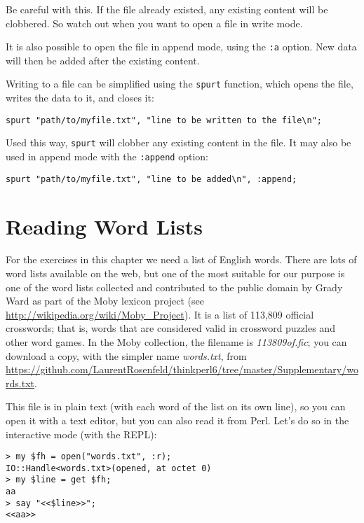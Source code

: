 Be careful with this. If the file already existed, any 
existing content will be clobbered. So watch out when 
you want to open a file in write mode.

It is also possible to open the file in append mode, using the 
{\tt :a} option. New data will then be added after the existing 
content.

Writing to a file can be simplified using the {\tt spurt} 
function, which opens the file, writes the data to it, 
and closes it:

\begin{verbatim}
spurt "path/to/myfile.txt", "line to be written to the file\n";
\end{verbatim}

Used this way, {\tt spurt} will clobber any existing content in 
the file. It may also be used in append mode with the {\tt :append} 
option:

\begin{verbatim}
spurt "path/to/myfile.txt", "line to be added\n", :append;
\end{verbatim}


\section{Reading Word Lists}
\label{wordlist}

For the exercises in this chapter we need a list of English 
words. There are lots of word lists available on the web, 
but one of the most suitable for our purpose is one of the 
word lists collected and contributed to the public domain 
by Grady Ward as part of the Moby lexicon project (see 
\url{http://wikipedia.org/wiki/Moby_Project}).  It is a 
list of 113,809 official crosswords; that is, words that are
considered valid in crossword puzzles and other word games.  
In the Moby collection, the filename is \emph{113809of.fic}; 
you can download a copy, with the simpler name \emph{words.txt}, 
from \url{https://github.com/LaurentRosenfeld/thinkperl6/tree/master/Supplementary/words.txt}.

This file is in plain text (with each word of the list on 
its own line), so you can open it with a text
editor, but you can also read it from Perl. Let's do so 
in the interactive mode (with the REPL):

\begin{verbatim}
> my $fh = open("words.txt", :r);
IO::Handle<words.txt>(opened, at octet 0)
> my $line = get $fh;
aa
> say "<<$line>>";
<<aa>>
\end{verbatim}

